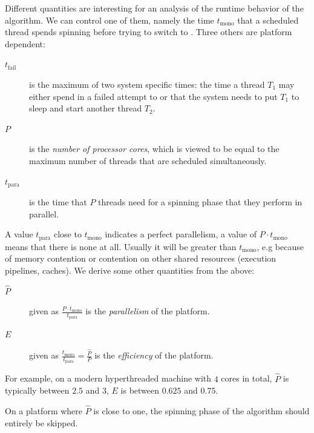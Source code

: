 Different quantities are interesting for an analysis of the runtime
behavior of the algorithm. We can control one of them, namely the
time $t_{\textrm{mono}}$ that a scheduled thread spends spinning
before trying to switch to .  Three others are platform
dependent:
\fi
\itemadjust
\begin{description}
\item[{$t_{\textrm{fail}}$}] is the maximum of two system specific
times: the time a thread $T_1$ may either spend in a failed
attempt to  or that the system needs to put $T_1$
to sleep and start another thread $T_2$.\itemadjust

\item[{$P$}] is the \emph{number of processor cores}, which is viewed to be
equal to the maximum number of threads that are scheduled
simultaneously.\itemadjust

\item[{$t_{\textrm{para}}$}] is the time that $P$ threads need for a
spinning phase that they perform in parallel.\itemadjust
\end{description}

\iflong%
A value $t_{\textrm{para}}$ close to $t_{\textrm{mono}}$ indicates
a perfect parallelism, a value of $P \cdot t_{\textrm{mono}}$
means that there is none at all. Usually it will be greater than
$t_{\textrm{mono}}$, e.g because of memory contention or
contention on other shared resources (execution pipelines,
caches). We derive some other quantities from the
above:\itemadjust


\begin{description}
\item[{$\widehat{P}$}] given as $\frac{P\cdot
                       t_{\textrm{mono}}}{t_{\textrm{para}}}$ is the
\emph{parallelism} of the platform.

\item[{$E$}] given as $\frac{t_\textrm{mono}}{t_{\textrm{para}}} =
             \frac{\widehat{P}}{P}$ is the \emph{efficiency} of the
platform.
\end{description}

For example, on a modern hyperthreaded machine with $4$ cores in
total, $\widehat{P}$ is typically between $2.5$ and $3$, $E$ is
between $0.625$ and $0.75$.

\begin{remark}
On a platform where $\widehat{P}$ is close to one, the spinning
phase of the algorithm should entirely be skipped.
\end{remark}

